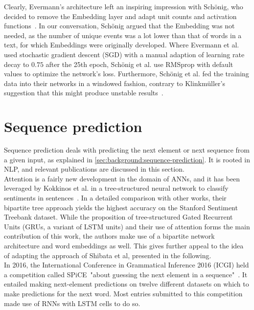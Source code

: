 Clearly, Evermann's architecture left an inspiring impression with Schönig, who decided to remove the Embedding layer and adapt unit counts and activation functions~\cite{schoenig2018}. In our conversation, Schönig argued that the Embedding was not needed, as the number of unique events was a lot lower than that of words in a text, for which Embeddings were originally developed. Where Evermann et al. used stochastic gradient descent (SGD) with a manual adaption of learning rate decay to $0.75$ after the 25th epoch, Schönig et al. use RMSprop with default values to optimize the network's loss. Furthermore, Schönig et al. fed the training data into their networks in a windowed fashion, contrary to Klinkmüller's suggestion that this might produce unstable results~\cite{klinkmuller2018reliablemonitoring}.

\section{Sequence prediction}\label{sec:related-work-sequence-prediction}
Sequence prediction deals with predicting the next element or next sequence from a given input, as explained in \autoref{sec:background:sequence-prediction}. It is rooted in NLP, and relevant publications are discussed in this section.\\

Attention is a fairly new development in the domain of ANNs, and it has been leveraged by Kokkinos et al. in a tree-structured neural network to classify sentiments in sentences~\cite{kokkinos2017structural}. In a detailed comparison with other works, their bipartite tree approach yields the highest accuracy on the Stanford Sentiment Treebank dataset. While the proposition of tree-structured Gated Recurrent Units (GRUs, a variant of LSTM units) and their use of attention forms the main contribution of this work, the authors make use of a bipartite network architecture and word embeddings as well. This gives further appeal to the idea of adapting the approach of Shibata et al, presented in the following.\\

In 2016, the International Conference in Grammatical Inference 2016 (ICGI) held a competition called SPiCE\ "about guessing the next element in a sequence"~\cite{web:spice}. It entailed making next-element predictions on twelve different datasets on which to make predictions for the next word. Most entries submitted to this competition made use of RNNs with LSTM cells to do so.\\

